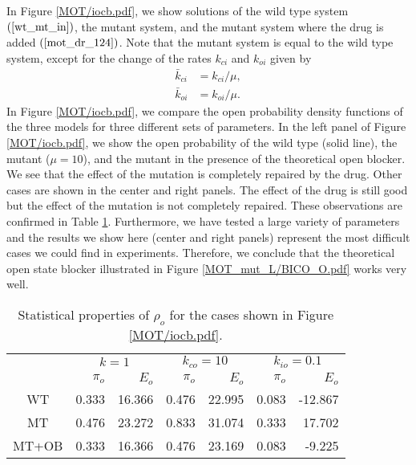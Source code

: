 In Figure \ref{MOT/iocb.pdf}, we show solutions of the wild type system 
$\left(\ref{wt_mt_in}\right)  $, the mutant system, and the mutant system where the
drug is added $\left(  \ref{mot_dr_124}\right)  $. Note that the mutant system
is equal to the wild type system, except for the change of the rates $k_{ci}$
and $k_{oi}$ given by
\begin{align}
\bar{k}_{ci} &  =k_{ci}/\mu,\\
\bar{k}_{oi} &  =k_{oi}/\mu.\nonumber
\end{align}
In Figure \ref{MOT/iocb.pdf},  we compare the open probability density functions of the three models for three
different sets of parameters. In the left panel of Figure \ref{MOT/iocb.pdf},  we show the open probability of the wild type (solid line),
 the mutant ($\mu=10$), and the mutant in the presence of the theoretical open blocker. We see that the effect of the
 mutation is completely repaired by the drug. Other cases are shown in the center and right panels. The effect of the drug is still good but the effect of the mutation is not completely repaired. These observations are confirmed in Table \ref{tab:iocb}.
Furthermore, we have  tested a large variety of parameters and the results 
we show here (center and right panels)  represent the most difficult cases we could find in experiments. 
Therefore, we conclude that the theoretical open state blocker illustrated in Figure  \ref{MOT_mut_L/BICO_O.pdf}
 works very well. 



\begin{table}  \begin{center}
\begin{tabular}{|c|r|r|r|r|r|r|} \hline
& \multicolumn{2}{c|}{$k=1$} &
\multicolumn{2}{c|}{$k_{co}=10$} &
\multicolumn{2}{c|}{$k_{io}=0.1$}  \\ \cline{2-7}
 & $\pi_o$ & $E_o$ & $\pi_o$ & $E_o$ & $\pi_o$ & $E_o$ \\ \hline
WT&0.333 & 16.366 & 0.476 & 22.995 & 0.083 & -12.867 \\ \hline
MT&0.476 & 23.272 & 0.833 & 31.074 & 0.333 & 17.702 \\ \hline
MT+OB&0.333 & 16.366 & 0.476 & 23.169 & 0.083 & -9.225 \\ \hline
\end{tabular} \end{center}
\caption{Statistical properties of $\rho_o$ for the cases shown in Figure \ref{MOT/iocb.pdf}.\label{tab:iocb}}
\end{table}



